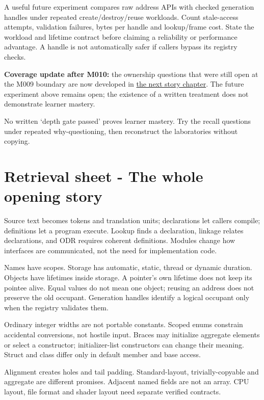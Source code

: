 A useful future experiment compares raw address APIs with checked generation handles under repeated create/destroy/reuse workloads. Count stale-access attempts, validation failures, bytes per handle and lookup/frame cost. State the workload and lifetime contract before claiming a reliability or performance advantage. A handle is not automatically safer if callers bypass its registry checks.

\textbf{Coverage update after M010:} the ownership questions that were still open at the M009 boundary are now developed in \hyperref[01-foundations-i-ch004-from-a-live-object-to-responsible-resource-ownership]{the next story chapter}. The future experiment above remains open; the existence of a written treatment does not demonstrate learner mastery.

No written `depth gate passed' proves learner mastery. Try the recall questions under repeated why-questioning, then reconstruct the laboratories without copying.

\section{Retrieval sheet - The whole opening story}\label{01-foundations-i-ch004-retrieval-sheet---the-whole-opening-story}

\hypertarget{01-foundations-i-ch004-retrieval-sheet---the-whole-opening-story}{}

Source text becomes tokens and translation units; declarations let callers compile; definitions let a program execute. Lookup finds a declaration, linkage relates declarations, and ODR requires coherent definitions. Modules change how interfaces are communicated, not the need for implementation code.

Names have scopes. Storage has automatic, static, thread or dynamic duration. Objects have lifetimes inside storage. A pointer's own lifetime does not keep its pointee alive. Equal values do not mean one object; reusing an address does not preserve the old occupant. Generation handles identify a logical occupant only when the registry validates them.

Ordinary integer widths are not portable constants. Scoped enums constrain accidental conversions, not hostile input. Braces may initialize aggregate elements or select a constructor; initializer-list constructors can change their meaning. Struct and class differ only in default member and base access.

Alignment creates holes and tail padding. Standard-layout, trivially-copyable and aggregate are different promises. Adjacent named fields are not an array. CPU layout, file format and shader layout need separate verified contracts.


